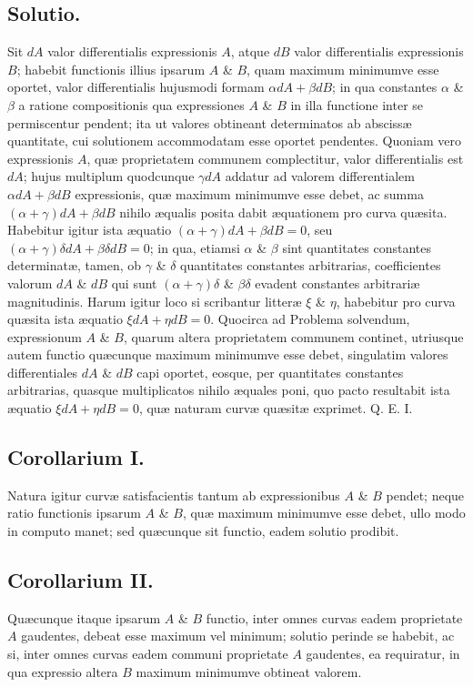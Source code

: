 \subsection*{Solutio.}
Sit $dA$ valor differentialis expressionis $A$, atque $dB$ valor differentialis expressionis $B$; habebit functionis illius ipsarum $A$ \& $B$, quam maximum minimumve esse oportet, valor differentialis hujusmodi formam $\alpha dA+\beta dB$; in qua constantes $\alpha$ \& $\beta$ a ratione compositionis qua expressiones $A$ \& $B$ in illa functione inter se permiscentur pendent; ita ut valores obtineant determinatos ab abscissæ quantitate, cui solutionem accommodatam esse oportet pendentes. Quoniam vero expressionis $A$, quæ proprietatem communem complectitur, valor differentialis est
$dA$; hujus multiplum quodcunque $\gamma dA$ addatur ad valorem differentialem $\alpha dA+\beta dB$ expressionis, quæ maximum minimumve esse debet, ac summa $(\alpha+\gamma)dA+\beta dB$ nihilo æqualis posita dabit æquationem pro curva quæsita. Habebitur igitur ista æquatio $(\alpha+\gamma)dA+\beta dB=0$, seu $(\alpha+\gamma)\delta dA+\beta\delta dB=0$; in qua, etiamsi $\alpha$ \& $\beta$ sint quantitates constantes determinatæ, tamen, ob $\gamma$ \& $\delta$ quantitates constantes arbitrarias, coefficientes valorum $dA$ \& $dB$ qui sunt $(\alpha+\gamma)\delta$ \& $\beta\delta$ evadent constantes arbitrariæ magnitudinis. Harum igitur loco si scribantur litteræ $\xi$ \& $\eta$, habebitur pro curva quæsita ista æquatio $\xi dA+\eta dB=0$. Quocirca ad Problema solvendum, expressionum $A$ \& $B$, quarum altera proprietatem communem continet, utriusque autem functio quæcunque maximum minimumve esse debet, singulatim valores differentiales $dA$ \& $dB$ capi oportet, eosque, per quantitates constantes arbitrarias, quasque multiplicatos nihilo æquales poni, quo pacto resultabit ista æquatio $\xi dA+\eta dB=0$, quæ naturam curvæ quæsitæ exprimet. Q. E. I.

\subsection*{Corollarium I.}
Natura igitur curvæ satisfacientis tantum ab expressionibus $A$ \& $B$ pendet; neque ratio functionis ipsarum $A$ \& $B$, quæ maximum minimumve esse debet, ullo modo in computo manet; sed quæcunque sit functio, eadem solutio prodibit.

\subsection*{Corollarium II.}
Quæcunque itaque ipsarum $A$ \& $B$ functio, inter omnes curvas eadem proprietate $A$ gaudentes, debeat esse maximum vel minimum; solutio perinde se habebit, ac si, inter omnes curvas eadem communi proprietate $A$ gaudentes, ea requiratur, in qua expressio altera $B$ maximum minimumve obtineat valorem.

